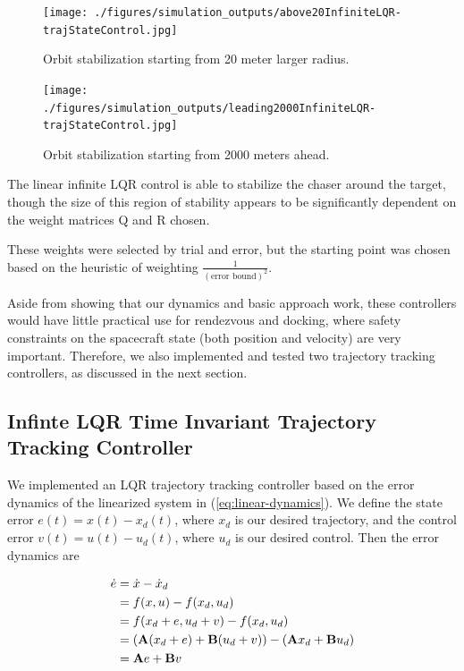 \documentclass[conference]{IEEEtran}
\begin{document}

\begin{figure}[t]
    \centerline{\texttt{[image: ./figures/simulation\_outputs/above20InfiniteLQR-trajStateControl.jpg]}}
    \caption{Orbit stabilization starting from 20 meter larger radius.}
    \label{fig:above20}
\end{figure}

\begin{figure}[t]
    \centerline{\texttt{[image: ./figures/simulation\_outputs/leading2000InfiniteLQR-trajStateControl.jpg]}}
    \caption{Orbit stabilization starting from 2000 meters ahead.}
    \label{fig:leading2000}
\end{figure}

The linear infinite LQR control is able to stabilize the chaser around the
target, though the size of this region of stability appears to be significantly
dependent on the weight matrices Q and R chosen.

These weights were selected by trial and error, but the starting point was
chosen based on the heuristic of weighting $\frac{1}{(\text{error bound})^2}$.

Aside from showing that our dynamics and basic approach work, these controllers
would have little practical use for rendezvous and docking, where safety
constraints on the spacecraft state (both position and velocity) are very
important. Therefore, we also implemented and tested two trajectory tracking
controllers, as discussed in the next section.


\subsection{Infinte LQR Time Invariant Trajectory Tracking Controller}

We implemented an LQR trajectory tracking controller based on the error
dynamics of the linearized system in (\ref{eq:linear-dynamics}). 
We define the state error $e(t) = x(t) - x_d(t)$, where $x_d$ is our desired
trajectory, and the control error $v(t) = u(t) - u_d(t)$, where $u_d$ is our
desired control. Then the error dynamics are

\begin{equation}
    \label{eq:linearize-error-dynamics}
    \begin{split}
        \dot{e} & = \dot{x} - \dot{x}_d \\
                & = f(x, u) - f(x_d, u_d) \\
                & = f(x_d + e, u_d + v) - f(x_d, u_d) \\
                & = ({\bf A}(x_d + e) + {\bf B}(u_d + v)) - ({\bf A}x_d +
                    {\bf B}u_d) \\
                & = {\bf A}e + {\bf B}v
    \end{split}
\end{equation}
\end{document}
